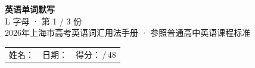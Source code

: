 \documentclass[10pt,a4paper]{article}
\begin{document}
\pagestyle{plain}

\begin{center}
{\LARGE\bfseries 英语单词默写}\\[0.22em]
{\large L 字母 · 第 1 / 3 份}\\[0.18em]
{\small 2026年上海市高考英语词汇用法手册 · 参照普通高中英语课程标准}
\end{center}

\vspace{0.25em}
\noindent\begin{tabular}{@{}p{}@{}p{}@{}p{}@{}}
姓名：\underline{\hspace{2.0cm}} & 日期：\underline{\hspace{2.0cm}} & 得分：\underline{\hspace{1.3cm}}\,/\,48 \\
\end{tabular}

\vspace{0.3em}

\vspace{0.08em}
\end{document}
